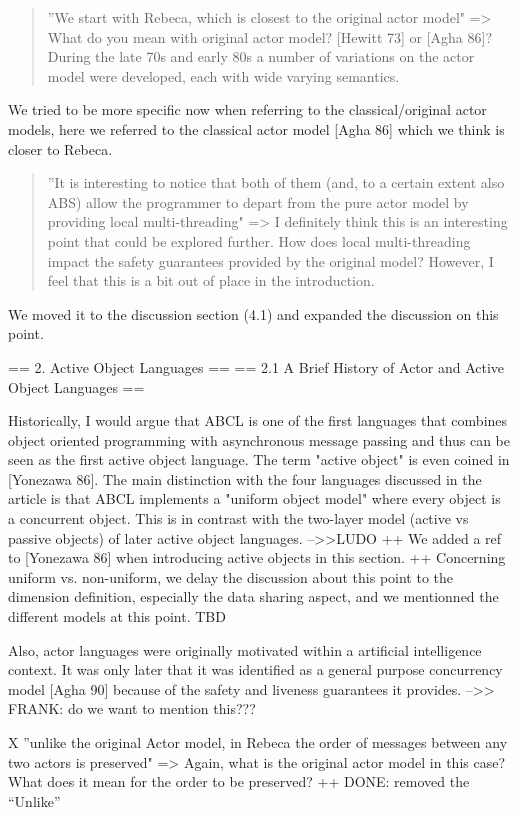 \documentclass{article}
\begin{document}
 \begin{quote}
	”We start with Rebeca, which is closest to the original actor model" => What do you 
mean with original actor model? [Hewitt 73] or [Agha 86]? During the late 70s and early 
80s a number of variations on the actor model were developed, each with wide varying 
semantics.
\end{quote}
We tried to be more specific now when referring to the classical/original actor models, 
here we referred to the classical actor model [Agha 86] which we think is closer to 
Rebeca.

\begin{quote}
	”It is interesting to notice that both of them (and, to a certain extent also ABS) 
allow the programmer to depart from the pure actor model by providing local 
multi-threading" => I definitely think this is an interesting point that could be 
explored further. How does local multi-threading impact the safety guarantees provided by 
the original model? However, I feel that this is a bit out of place in the introduction.
\end{quote}
We moved it to the discussion section (4.1) and expanded the discussion on this point.


== 2. Active Object Languages ==
== 2.1 A Brief History of Actor and Active Object Languages ==

Historically, I would argue that ABCL is one of the first languages that combines object 
oriented programming with asynchronous message passing and thus can be seen as the first 
active object language. The term "active object" is even coined in [Yonezawa 86]. The 
main distinction with the four languages discussed in the article is that ABCL implements 
a "uniform object model" where every object is a concurrent object. This is in contrast 
with the two-layer model (active vs passive objects) of later active object languages.
-->>LUDO
++ We added a ref to [Yonezawa 86] when introducing active objects in this section.
++ Concerning uniform vs. non-uniform, we delay the discussion about this point to the 
dimension definition, especially the data sharing aspect, and we mentionned the different 
models at this point.
TBD

Also, actor languages were originally motivated within a artificial intelligence context. 
It was only later that it was identified as a general purpose concurrency model [Agha 90] 
because of the safety and liveness guarantees it provides.
-->> FRANK: do we want to mention this???

X ”unlike the original Actor model, in Rebeca the order of messages between any two 
actors is preserved" => Again, what is the original actor model in this case? What does 
it mean for the order to be preserved?
++ DONE: removed the “Unlike”
\end{document}
